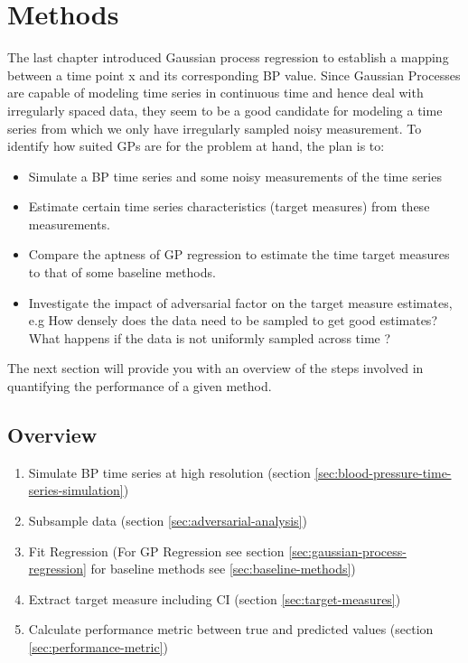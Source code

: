 \chapter{Methods}\label{ch:methods}

The last chapter introduced Gaussian process regression
to establish a mapping between a time point x and its
corresponding BP value.
Since Gaussian Processes are capable of modeling time series in continuous
time and hence deal with irregularly spaced data,
they seem to be a good candidate for modeling a time series from which
we only have irregularly sampled noisy measurement.
To identify how suited GPs are for the problem at hand, the plan is to:
\begin{itemize}
    \item Simulate a BP time series and some noisy measurements of the time series
    \item Estimate certain time series characteristics (target measures) from these measurements.
    \item Compare the aptness of GP regression to estimate the time target measures to that of some baseline methods.
    \item Investigate the impact of adversarial factor on the target measure estimates, e.g
    How densely does the data need to be sampled to get good estimates?
    What happens if the data is not uniformly sampled across time ?
\end{itemize}

The next section will provide you with an overview of the steps involved
in quantifying the performance of a given method.


\section{Overview}

\begin{enumerate}
    \item Simulate BP time series at high resolution (section \ref{sec:blood-pressure-time-series-simulation})
    \item Subsample data (section \ref{sec:adversarial-analysis})
    \item Fit Regression (For GP Regression see section \ref{sec:gaussian-process-regression}
    for baseline methods see \ref{sec:baseline-methods})
    \item Extract target measure including CI (section \ref{sec:target-measures})
    \item Calculate performance metric between true and predicted values (section \ref{sec:performance-metric})

\end{enumerate}




